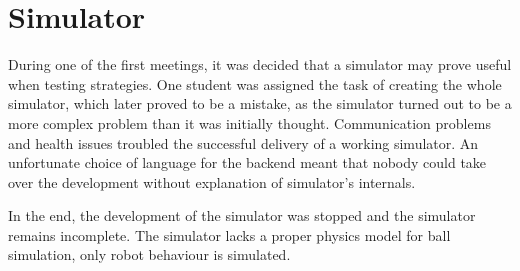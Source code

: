 \section{Simulator}
During one of the first meetings, it was decided that a simulator may prove useful when testing strategies. One student was assigned the task of creating the whole simulator, which later proved to be a mistake, as the simulator turned out to be a more complex problem than it was initially thought. Communication problems and health issues troubled the successful delivery of a working simulator. An unfortunate choice of language for the backend meant that nobody could take over the development without explanation of simulator's internals.

In the end, the development of the simulator was stopped and the simulator remains incomplete. The simulator lacks a proper physics model for ball simulation, only robot behaviour is simulated.
